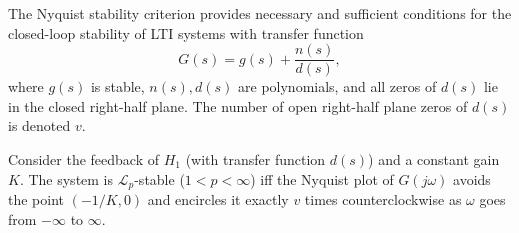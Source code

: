The Nyquist stability criterion provides necessary and sufficient conditions for the closed-loop stability of LTI systems with transfer function
\begin{equation}
    G(s) = g(s) + \frac{n(s)}{d(s)},
\end{equation}
where $g(s)$ is stable, $n(s),d(s)$ are polynomials, and all zeros of $d(s)$ lie in the closed right-half plane. The number of open right-half plane zeros of $d(s)$ is denoted $v$.  

\begin{proposition}
Consider the feedback of $H_1$ (with transfer function $d(s)$) and a constant gain $K$. The system is $\mathcal{L}_p$-stable ($1<p<\infty$) iff the Nyquist plot of $G(j\omega)$ avoids the point $(-1/K,0)$ and encircles it exactly $v$ times counterclockwise as $\omega$ goes from $-\infty$ to $\infty$.
\end{proposition}

